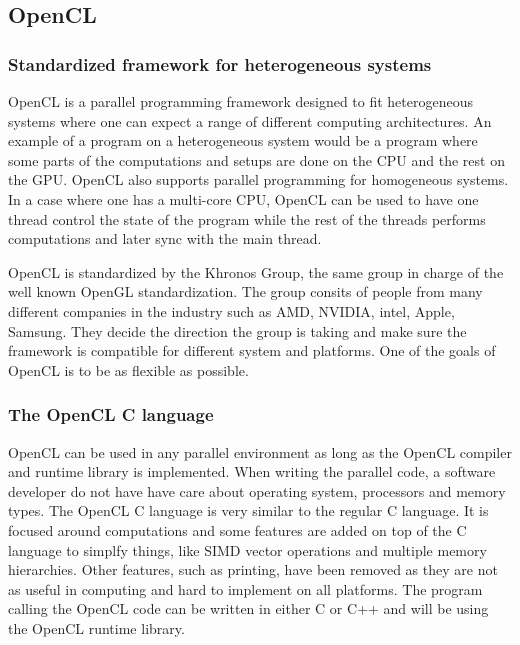 \subsection{OpenCL}

\subsubsection{Standardized framework for heterogeneous systems}

OpenCL is a parallel programming framework designed to fit heterogeneous systems where one can expect a range of different computing architectures. An example of a program on a heterogeneous system would be a program where some parts of the computations and setups are done on the CPU and the rest on the GPU. OpenCL also supports parallel programming for homogeneous systems. In a case where one has a multi-core CPU, OpenCL can be used to have one thread control the state of the program while the rest of the threads performs computations and later sync with the main thread.
\newline

OpenCL is standardized by the Khronos Group, the same group in charge of the well known OpenGL standardization. The group consits of people from many different companies in the industry such as AMD, NVIDIA, intel, Apple, Samsung. They decide the direction the group is taking and make sure the framework is compatible for different system and platforms. One of the goals of OpenCL is to be as flexible as possible.
\newline

\subsubsection{The OpenCL C language}
OpenCL can be used in any parallel environment as long as the OpenCL compiler and runtime library is implemented. When writing the parallel code, a software developer do not have have care about operating system, processors and memory types. The OpenCL C language is very similar to the regular C language. It is focused around computations and some features are added on top of the C language to simplfy things, like SIMD vector operations and multiple memory hierarchies. Other features, such as printing, have been removed as they are not as useful in computing and hard to implement on all platforms. The program calling the OpenCL code can be written in either C or C++ and will be using the OpenCL runtime library. 
\newline

